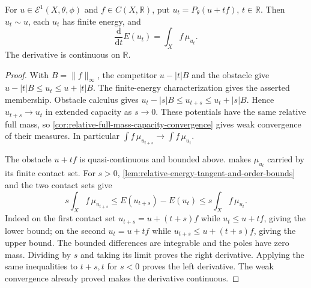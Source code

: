 \begin{proposition}\label{prop:projected-energy-first-variation}
For $u\in\mathcal E^1(X,\theta,\phi)$ and $f\in C(X,\mathbb R)$, put $u_t=P_\theta(u+tf)$, $t\in\mathbb R$. Then $u_t\sim u$, each $u_t$ has finite energy, and
\[
 \frac{\mathrm d}{\mathrm dt}E(u_t)=\int_Xf\,\mu_{u_t}.
\]
The derivative is continuous on $\mathbb R$.
\end{proposition}
\begin{proof}
With $B=\|f\|_\infty$, the competitor $u-|t|B$ and the obstacle give
$u-|t|B\leq u_t\leq u+|t|B$.
The finite-energy characterization gives the asserted membership. Obstacle calculus gives
$u_t-|s|B\leq u_{t+s}\leq u_t+|s|B$.
Hence $u_{t+s}\to u_t$ in extended capacity as $s\to0$. These potentials have the same relative full mass, so \cref{cor:relative-full-mass-capacity-convergence} gives weak convergence of their measures. In particular $\int f\,\mu_{u_{t+s}}\to\int f\,\mu_{u_t}$.

The obstacle $u+tf$ is quasi-continuous and bounded above.  makes $\mu_{u_t}$ carried by its finite contact set. For $s>0$, \cref{lem:relative-energy-tangent-and-order-bounds} and the two contact sets give
\[
 s\int_Xf\,\mu_{u_{t+s}}
 \leq E(u_{t+s})-E(u_t)
 \leq s\int_Xf\,\mu_{u_t}.
\]
Indeed on the first contact set $u_{t+s}=u+(t+s)f$ while $u_t\leq u+tf$, giving the lower bound; on the second $u_t=u+tf$ while $u_{t+s}\leq u+(t+s)f$, giving the upper bound. The bounded differences are integrable and the poles have zero mass. Dividing by $s$ and taking its limit proves the right derivative. Applying the same inequalities to $t+s,t$ for $s<0$ proves the left derivative. The weak convergence already proved makes the derivative continuous.
\end{proof}

